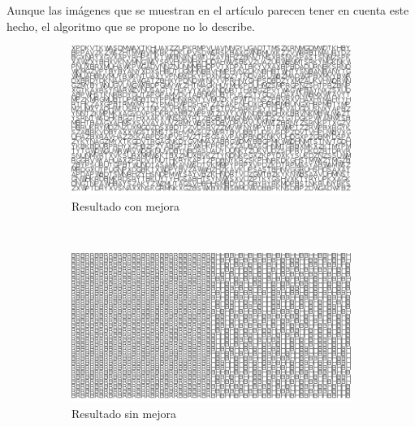 Aunque las imágenes que se muestran en el artículo \cite{articulo_base} parecen
tener en cuenta este hecho, el algoritmo que se propone no lo describe.

\begin{figure}[hp]
	\centering
	\begin{subfigure}[t]{0.8\textwidth}
		\centering
		\includegraphics[width=\textwidth]{images/rep_mejorado}
		\caption{Resultado con mejora}
	\end{subfigure}
	\\[0.5cm]
	\begin{subfigure}[t]{0.8\textwidth}
		\centering
		\includegraphics[width=\textwidth]{images/rep_sin_mejora}
		\caption{Resultado sin mejora}
	\end{subfigure}
	\\[0.5cm]
	\begin{subfigure}[t]{0.2\textwidth}
		\centering

\end{subfigure}
\end{figure}
